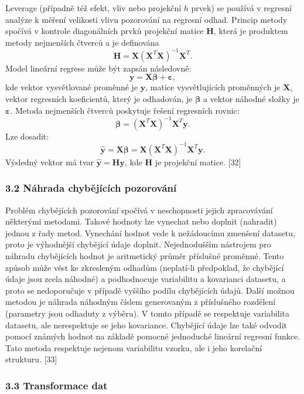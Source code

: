 \documentclass[12pt,]{article}
\begin{document}
\qquad Leverage (případně též efekt, vliv nebo projekční \(h\) prvek) se
používá v regresní analýze k měření velikosti vlivu pozorování na
regresní odhad. Princip metody spočívá v kontrole diagonálních prvků
projekční matice \(\bm{H}\), která je produktem metody nejmenších
čtverců a je definována
\[\bm{H} = \bm{X}(\bm{X}^T\bm{X})^{-1}\bm{X}^T.\] Model lineární regrese
může být zapsán následovně:
\[\bm{y} = \bm{X \beta} + \bm{\varepsilon},\] kde vektor vysvětlované
proměnné je \(\bm{y}\), matice vysvětlujících proměnných je \(\bm{X}\),
vektor regresních koeficientů, který je odhadován, je \(\bm{\beta}\) a
vektor náhodné složky je \(\bm{\varepsilon}\). Metoda nejmenších čtverců
poskytuje řešení regresních rovnic:
\[\bm{\beta} = (\bm{X}^T\bm{X})^{-1} \bm{X}^T \bm{y}.\] Lze dosadit:
\[\hat{\bm{y}} = \bm{X \beta} = \bm{X}(\bm{X}^T\bm{X})^{-1} \bm{X}^T \bm{y}.\]
Výsledný vektor má tvar \(\hat{\bm{y}} = \bm{Hy}\), kde \(\bm{H}\) je
projekční matice. {[}32{]}

\subsubsection{3.2 Náhrada chybějících
pozorování}\label{nahrada-chybejicich-pozorovani}

\qquad Problém chybějících pozorování spočívá v neschopnosti jejich
zpracovávání některými metodami. Takové hodnoty lze vynechat nebo
doplnit (nahradit) jednou z řady metod. Vynechání hodnot vede k
nežádoucímu zmenšení datasetu, proto je výhodnější chybějící údaje
doplnit. Nejednodušším nástrojem pro náhradu chybějících hodnot je
aritmetický průměr příslušné proměnné. Tento způsob může vést ke
zkresleným odhadům (neplatí-li předpoklad, že chybějící údaje jsou zcela
náhodné) a podhodnocuje variabilitu a kovarianci datasetu, a proto se
nedoporučuje v případě vyššího podílu chybějících údajů. Další možnou
metodou je náhrada náhodným číslem generovaným z příslušného rozdělení
(parametry jsou odhaduty z výběru). V tomto případě se respektuje
variabilita datasetu, ale nerespektuje se jeho kovariance. Chybějící
údaje lze také odvodit pomocí známých hodnot na základě pomocné
jednoduché lineární regresní funkce. Tato metoda respektuje nejenom
variabilitu vzorku, ale i jeho korelační strukturu. {[}33{]}

\subsubsection{3.3 Transformace dat}\label{transformace-dat}
\end{document}
